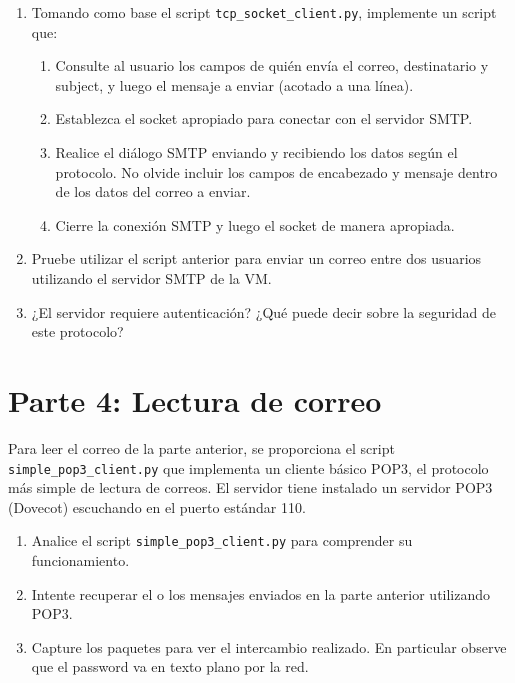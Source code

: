 \documentclass[a4paper,10pt]{article}
\begin{document}
\begin{enumerate}
    \item Tomando como base el script \texttt{tcp\_socket\_client.py}, implemente un script que:
      \begin{enumerate}
        \item Consulte al usuario los campos de quién envía el correo, destinatario y subject, y luego el mensaje a enviar (acotado a una línea).
        \item Establezca el socket apropiado para conectar con el servidor SMTP.
        \item Realice el diálogo SMTP enviando y recibiendo los datos según el protocolo. No olvide incluir los campos de encabezado y mensaje dentro de los datos del correo a enviar.
        \item Cierre la conexión SMTP y luego el socket de manera apropiada.
      \end{enumerate}

    \item Pruebe utilizar el script anterior para enviar un correo entre dos usuarios utilizando el servidor SMTP de la VM.
    \item ¿El servidor requiere autenticación? ¿Qué puede decir sobre la seguridad de este protocolo? 
\end{enumerate}

\section*{Parte 4: Lectura de correo}

Para leer el correo de la parte anterior, se proporciona el script \texttt{simple\_pop3\_client.py} que implementa un cliente básico POP3, el protocolo más simple de lectura de correos. El servidor tiene instalado un servidor POP3 (Dovecot) escuchando en el puerto estándar 110.

\begin{enumerate}
    \item Analice el script \texttt{simple\_pop3\_client.py} para comprender su funcionamiento.
    \item Intente recuperar el o los mensajes enviados en la parte anterior utilizando POP3.
    \item Capture los paquetes para ver el intercambio realizado. En particular observe que el password va en texto plano por la red.
\end{enumerate}

\appendix
\end{document}
